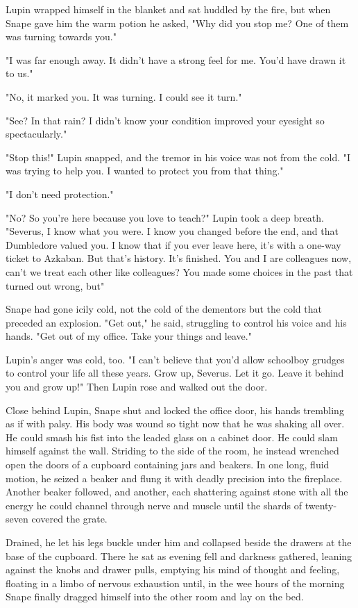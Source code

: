 Lupin wrapped himself in the blanket and sat huddled by the fire, but when Snape gave him the warm potion he asked, "Why did you stop me? One of them was turning towards you."

"I was far enough away. It didn't have a strong feel for me. You'd have drawn it to us."

"No, it marked you. It was turning. I could see it turn."

"See? In that rain? I didn't know your condition improved your eyesight so spectacularly."

"Stop this!" Lupin snapped, and the tremor in his voice was not from the cold. "I was trying to help you. I wanted to protect you from that thing."

"I don't need protection."

"No? So you're here because you love to teach?" Lupin took a deep breath. "Severus, I know what you were. I know you changed before the end, and that Dumbledore valued you. I know that if you ever leave here, it's with a one-way ticket to Azkaban. But that's history. It's finished. You and I are colleagues now, can't we treat each other like colleagues? You made some choices in the past that turned out wrong, but{\el}"

Snape had gone icily cold, not the cold of the dementors but the cold that preceded an explosion. "Get out," he said, struggling to control his voice and his hands. "Get out of my office. Take your things and leave."

Lupin's anger was cold, too. "I can't believe that you'd allow schoolboy grudges to control your life all these years. Grow up, Severus. Let it go. Leave it behind you and grow up!" Then Lupin rose and walked out the door.

Close behind Lupin, Snape shut and locked the office door, his hands trembling as if with palsy. His body was wound so tight now that he was shaking all over. He could smash his fist into the leaded glass on a cabinet door. He could slam himself against the wall. Striding to the side of the room, he instead wrenched open the doors of a cupboard containing jars and beakers. In one long, fluid motion, he seized a beaker and flung it with deadly precision into the fireplace. Another beaker followed, and another, each shattering against stone with all the energy he could channel through nerve and muscle until the shards of twenty-seven covered the grate.

Drained, he let his legs buckle under him and collapsed beside the drawers at the base of the cupboard. There he sat as evening fell and darkness gathered, leaning against the knobs and drawer pulls, emptying his mind of thought and feeling, floating in a limbo of nervous exhaustion until, in the wee hours of the morning Snape finally dragged himself into the other room and lay on the bed.

